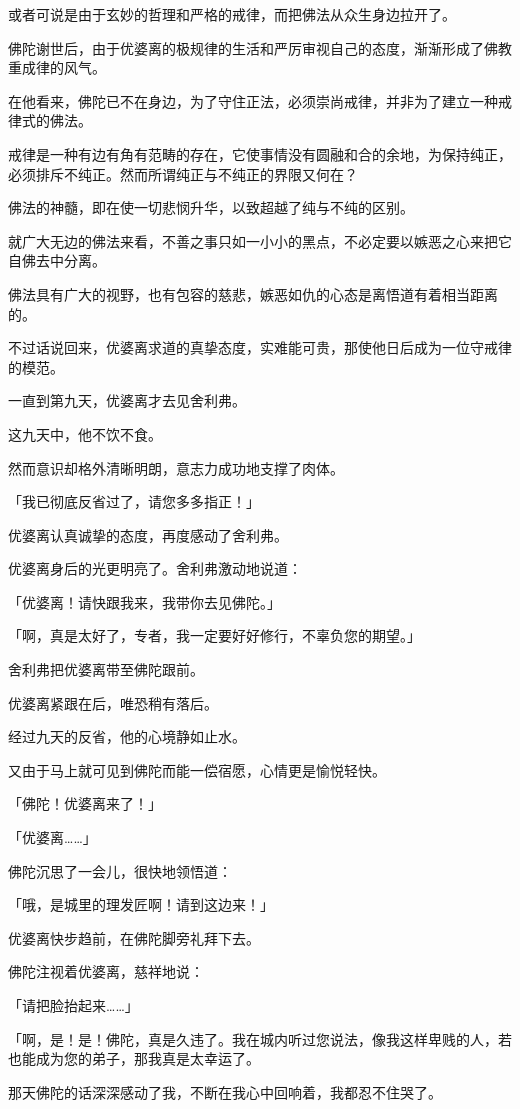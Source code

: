 \documentclass[twoside,openany]{book}
\begin{document}
或者可说是由于玄妙的哲理和严格的戒律，而把佛法从众生身边拉开了。

佛陀谢世后，由于优婆离的极规律的生活和严厉审视自己的态度，渐渐形成了佛教重成律的风气。

在他看来，佛陀已不在身边，为了守住正法，必须崇尚戒律，并非为了建立一种戒律式的佛法。

戒律是一种有边有角有范畴的存在，它使事情没有圆融和合的余地，为保持纯正，必须排斥不纯正。然而所谓纯正与不纯正的界限又何在？

佛法的神髓，即在使一切悲悯升华，以致超越了纯与不纯的区别。

就广大无边的佛法来看，不善之事只如一小小的黑点，不必定要以嫉恶之心来把它自佛去中分离。

佛法具有广大的视野，也有包容的慈悲，嫉恶如仇的心态是离悟道有着相当距离的。

不过话说回来，优婆离求道的真挚态度，实难能可贵，那使他日后成为一位守戒律的模范。

一直到第九天，优婆离才去见舍利弗。

这九天中，他不饮不食。

然而意识却格外清晰明朗，意志力成功地支撑了肉体。

「我已彻底反省过了，请您多多指正！」

优婆离认真诚挚的态度，再度感动了舍利弗。

优婆离身后的光更明亮了。舍利弗激动地说道：

「优婆离！请快跟我来，我带你去见佛陀。」

「啊，真是太好了，专者，我一定要好好修行，不辜负您的期望。」

舍利弗把优婆离带至佛陀跟前。

优婆离紧跟在后，唯恐稍有落后。

经过九天的反省，他的心境静如止水。

又由于马上就可见到佛陀而能一偿宿愿，心情更是愉悦轻快。

「佛陀！优婆离来了！」

「优婆离……」

佛陀沉思了一会儿，很快地领悟道：

「哦，是城里的理发匠啊！请到这边来！」

优婆离快步趋前，在佛陀脚旁礼拜下去。

佛陀注视着优婆离，慈祥地说：

「请把脸抬起来……」

「啊，是！是！佛陀，真是久违了。我在城内听过您说法，像我这样卑贱的人，若也能成为您的弟子，那我真是太幸运了。

那天佛陀的话深深感动了我，不断在我心中回响着，我都忍不住哭了。
\end{document}
